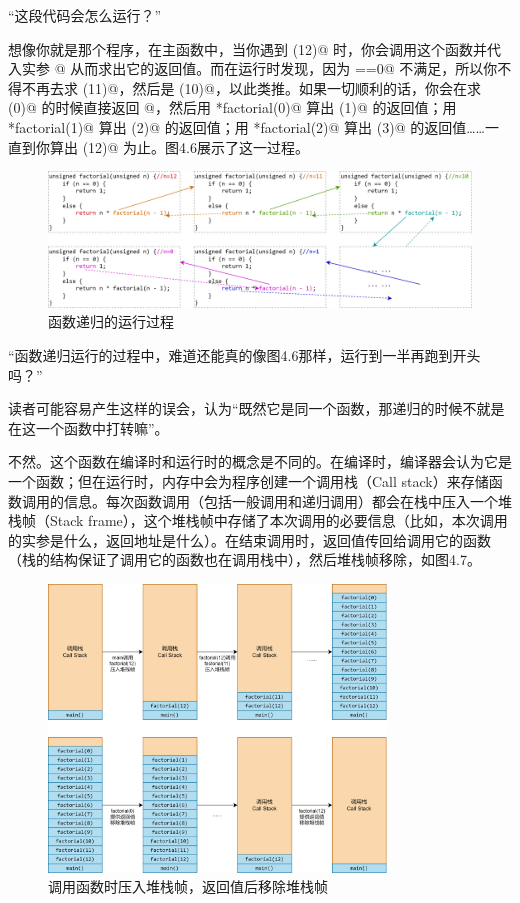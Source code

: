 {\kaishu ``这段代码会怎么运行？''}\par
想像你就是那个程序，在主函数中，当你遇到 \lstinline@factorial(12)@ 时，你会调用这个函数并代入实参 @ 从而求出它的返回值。而在运行时发现，因为 \lstinline@n==0@ 不满足，所以你不得不再去求 \lstinline@factorial(11)@，然后是 \lstinline@factorial(10)@，以此类推。如果一切顺利的话，你会在求 \lstinline@factorial(0)@ 的时候直接返回 @，然后用 *factorial(0)@ 算出 \lstinline@factorial(1)@ 的返回值；用 *factorial(1)@ 算出 \lstinline@factorial(2)@ 的返回值；用 *factorial(2)@ 算出 \lstinline@factorial(3)@ 的返回值……一直到你算出 \lstinline@factorial(12)@ 为止。图4.6展示了这一过程。\par
\begin{figure}[htbp]
    \centering
    \includegraphics[width=\textwidth]{../images/generalized_parts/04_the_process_of_recursion_300.png}
    \caption{\lstinline@factorial@ 函数递归的运行过程}
\end{figure}
{\kaishu ``函数递归运行的过程中，难道还能真的像图4.6那样，运行到一半再跑到开头吗？''}\par
读者可能容易产生这样的误会，认为``既然它是同一个函数，那递归的时候不就是在这一个函数中打转嘛''。\par
不然。这个函数在编译时和运行时的概念是不同的。在编译时，编译器会认为它是一个函数；但在运行时，内存中会为程序创建一个调用栈（Call stack）来存储函数调用的信息。每次函数调用（包括一般调用和递归调用）都会在栈中压入一个堆栈帧（Stack frame），这个堆栈帧中存储了本次调用的必要信息（比如，本次调用的实参是什么，返回地址是什么）。在结束调用时，返回值传回给调用它的函数（栈的结构保证了调用它的函数也在调用栈中），然后堆栈帧移除，如图4.7。\par
\begin{figure}[htbp]
    \centering
    \includegraphics[width=0.8\textwidth]{.//images/generalized_parts/04_call_stack_structure_300.png}
    \caption{调用函数时压入堆栈帧，返回值后移除堆栈帧}    
\end{figure}
